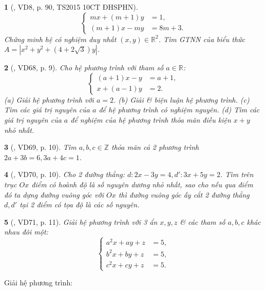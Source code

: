 \documentclass{article}
\newtheorem{baitoan}{}
\begin{document}
\begin{baitoan}[\cite{Kien_dai_so_9}, VD8, p. 90, TS2015 10CT ĐHSPHN]
	\begin{equation*}
		\left\{\begin{split}
			mx + (m + 1)y &= 1,\\
			(m + 1)x - my &= 8m + 3.
		\end{split}\right.
	\end{equation*}
	Chứng minh hệ có nghiệm duy nhất $(x,y)\in\mathbb{R}^2$. Tìm {\rm GTNN} của biểu thức $A = |x^2 + y^2 + (4 + 2\sqrt{3})y|$.
\end{baitoan}

\begin{baitoan}[\cite{Binh_Toan_9_tap_2}, VD68, p. 9]
	Cho hệ phương trình với tham số $a\in\mathbb{R}$:
	\begin{equation*}
		\left\{\begin{split}
			(a + 1)x - y &= a + 1,\\
			x + (a - 1)y &= 2.
		\end{split}\right.
	\end{equation*}
	(a) Giải hệ phương trình với $a = 2$. (b) Giải \& biện luận hệ phương trình. (c) Tìm các giá trị nguyên của $a$ để hệ phương trình có nghiệm nguyên. (d) Tìm các giá trị nguyên của $a$ để nghiệm của hệ phương trình thỏa mãn điều kiện $x + y$ nhỏ nhất.
\end{baitoan}

\begin{baitoan}[\cite{Binh_Toan_9_tap_2}, VD69, p. 10]
	Tìm $a,b,c\in\mathbb{Z}$ thỏa mãn cả 2 phương trình $2a + 3b = 6,3a + 4c = 1$.
\end{baitoan}

\begin{baitoan}[\cite{Binh_Toan_9_tap_2}, VD70, p. 10]
	Cho 2 đường thẳng: $d:2x - 3y = 4,d':3x + 5y = 2$. Tìm trên trục $Ox$ điểm có hoành độ là số nguyên dương nhỏ nhất, sao cho nếu qua điểm đó ta dựng đường vuông góc với $Ox$ thì đường vuông góc ấy cắt 2 đường thẳng $d,d'$ tại 2 điểm có tọa độ là các số nguyên.
\end{baitoan}

\begin{baitoan}[\cite{Binh_Toan_9_tap_2}, VD71, p. 11]
	Giải hệ phương trình với 3 ẩn $x,y,z$ \& các tham số $a,b,c$ khác nhau đôi một:
	\begin{equation*}
		\left\{\begin{split}
			a^2x + ay + z &= 5,\\
			b^2x + by + z &= 5,\\
			c^2x + cy + z &= 5.
		\end{split}\right.
	\end{equation*}
\end{baitoan}
Giải hệ phương trình:
\end{document}

